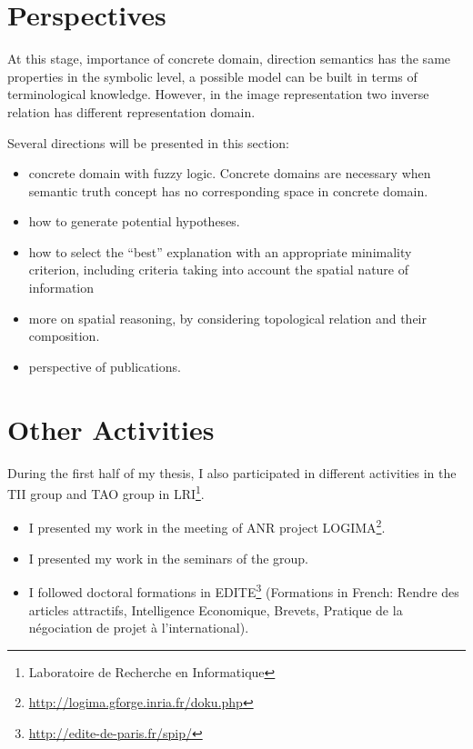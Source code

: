 \documentclass{article}
\begin{document}
\section{Perspectives}\label{sec:persp}
At this stage,
importance of concrete domain, direction semantics has the same properties in the symbolic level,
a possible model can be built in terms of terminological knowledge.  
However, in the image representation two inverse relation has different representation domain.

Several directions will be presented in this section:
\begin{itemize}
 \item concrete domain with fuzzy logic.
 Concrete domains are necessary when semantic truth concept has no corresponding space in concrete domain.
 \item how to generate potential hypotheses.
 \item how to select the ``best'' explanation with an appropriate minimality criterion, including criteria taking into account the spatial nature of information
 \item more on spatial reasoning, by considering topological relation and their composition.
 \item perspective of publications.
\end{itemize}

\section{Other Activities}
During the first half of my thesis, I also participated in different activities in the TII group and TAO group 
in LRI\footnote{Laboratoire de Recherche en Informatique}.
\begin{itemize}
 \item I presented my work in the meeting of ANR project LOGIMA\footnote{\url{http://logima.gforge.inria.fr/doku.php}}.
 \item I presented my work in the seminars of the group.
 \item I followed doctoral formations in EDITE\footnote{\url{http://edite-de-paris.fr/spip/}}
 (Formations in French: Rendre des articles attractifs, Intelligence Economique, Brevets, Pratique de la négociation de projet à l'international).
\end{itemize}



\end{document}
